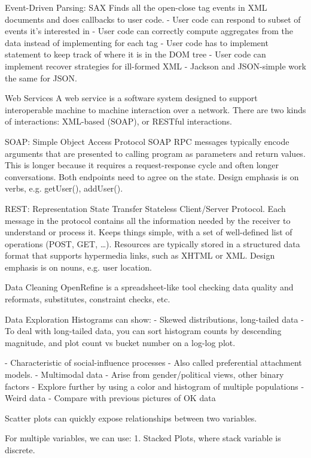 \documentclass[3pt,landscape]{article}
\begin{document}
\begin{multicols}{3}
Event-Driven Parsing: SAX
Finds all the open-close tag events in XML documents and does callbacks to user code.
- User code can respond to subset of events it’s interested in
- User code can correctly compute aggregates from the data instead of implementing for each tag
- User code has to implement statement to keep track of where it is in the DOM tree
- User code can implement recover strategies for ill-formed XML
- Jackson and JSON-simple work the same for JSON.

Web Services
A web service is a software system designed to support interoperable machine to machine interaction over a network. There are two kinds of interactions: XML-based (SOAP), or RESTful interactions.

SOAP: Simple Object Access Protocol
SOAP RPC messages typically encode arguments that are presented to calling program as parameters and return values. This is longer because it requires a request-response cycle and often longer conversations. Both endpoints need to agree on the state. Design emphasis is on verbs, e.g. getUser(), addUser().

REST: Representation State Transfer
Stateless Client/Server Protocol. Each message in the protocol contains all the information needed by the receiver to understand or process it. Keeps things simple, with a set of well-defined list of operations (POST, GET, …). Resources are typically stored in a structured data format that supports hypermedia links, such as XHTML or XML. Design emphasis is on nouns, e.g. user location.

Data Cleaning
OpenRefine is a spreadsheet-like tool checking data quality and reformats, substitutes, constraint checks, etc.

Data Exploration
Histograms can show:
- Skewed distributions, long-tailed data
  - To deal with long-tailed data, you can sort histogram counts by descending magnitude, and plot count vs bucket number on a log-log plot.

  - Characteristic of social-influence processes
  - Also called preferential attachment models.
- Multimodal data
  - Arise from gender/political views, other binary factors
  - Explore further by using a color and histogram of multiple populations
- Weird data
  - Compare with previous pictures of OK data

Scatter plots can quickly expose relationships between two variables.

For multiple variables, we can use:
1. Stacked Plots, where stack variable is discrete.


\end{multicols}
\end{document}
